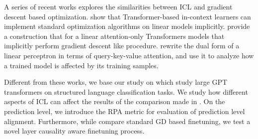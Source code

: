 A series of recent works explores the similarities between ICL and gradient descent based optimization. 
\cite{akyürek2023learning} show that Transformer-based in-context learners can implement standard optimization algorithms on linear models implicitly.
\cite{pmlr-v202-von-oswald23a} provide a construction that for a linear attention-only Transformers models that implicitly perform gradient descent like procedure.
\cite{irie22dual} rewrite the dual form of a linear perceptron in terms of query-key-value attention, and use it to analyze how a trained model is affected by its training samples.

Different from these works, we base our study on \cite{dai2023gpt} which study large GPT transformers on structured language classification tasks.
We study how different aspects of ICL can affect the results of the comparison made in \cite{dai2023gpt}.
On the prediction level, we introduce the RPA metric for evaluation of prediction level alignment.
Furthermore, while \cite{dai2023gpt} compare standard GD based finetuning, we test a novel layer causality aware finetuning process.